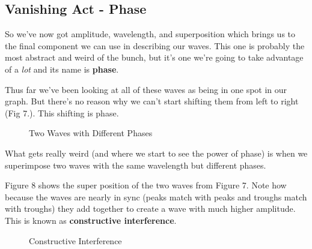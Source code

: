 \documentclass[10pt,a4paper]{article}
\begin{document}
\subsection{Vanishing Act - Phase}
So we've now got amplitude, wavelength, and superposition which brings us to the final component we can use in describing our waves. This one is probably the most abstract and weird of the bunch, but it's one we're going to take advantage of a \textit{lot} and its name is \textbf{phase}. 

Thus far we've been looking at all of these waves as being in one spot in our graph. But there's no reason why we can't start shifting them from left to right (Fig 7.). This shifting is phase.

\begin{figure}[!htb]
\caption{\label{fig:my-label} Two Waves with Different Phases}
\end{figure}

What gets really weird (and where we start to see the power of phase) is when we superimpose two waves with the same wavelength but different phases. 

Figure 8 shows the super position of the two waves from Figure 7. Note how because the waves are nearly in sync (peaks match with peaks and troughs match with troughs) they add together to create a wave with much higher amplitude. This is known as \textbf{constructive interference}.

\begin{figure}[!htb]
\caption{\label{fig:my-label} Constructive Interference}
\end{figure}
\end{document}
